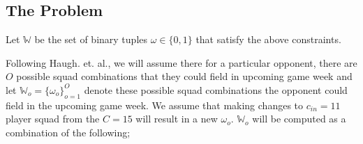 				\subsection{The Problem}

					Let $\mathbb{W}$ be the set of binary tuples $\omega \in  \{0,1\}$ that satisfy the above constraints.

					Following Haugh. et. al., we will assume there for a particular opponent, there are $O$  possible squad combinations that they could field in upcoming game week and let $\mathbb{W}_o = \{\omega_o\}^O_{o=1}$ denote these possible squad combinations the opponent could field in the upcoming game week.
					We assume that making changes to $c_{in}=11$ player squad from the $C=15$ will result in a new $\omega_o$. $\mathbb{W}_{o}$ will be computed as a combination of the following;


